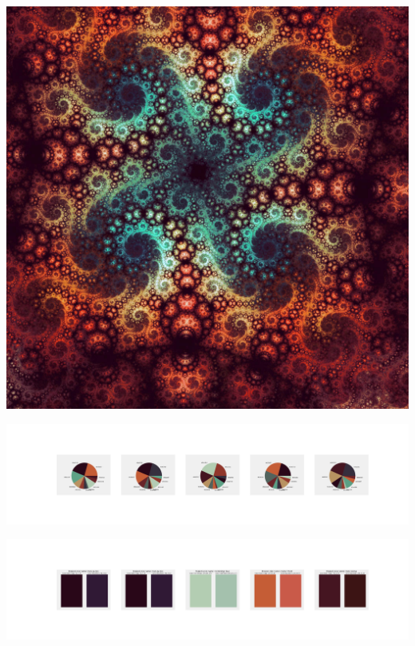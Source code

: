 \documentclass[11pt]{article}
\begin{document}
\begin{landscape}
    \begin{center}
    \includegraphics[width=\textwidth]{./nbimg/file (349).jpg}
    \end{center}

    \begin{center}
    \includegraphics[width=250mm]{./nbimg/pie-277.jpg}
    \end{center}

    \begin{center}
    \includegraphics[width=250mm]{./nbimg/peak-277.jpg}
    \end{center}
    


\end{landscape}
\end{document}
